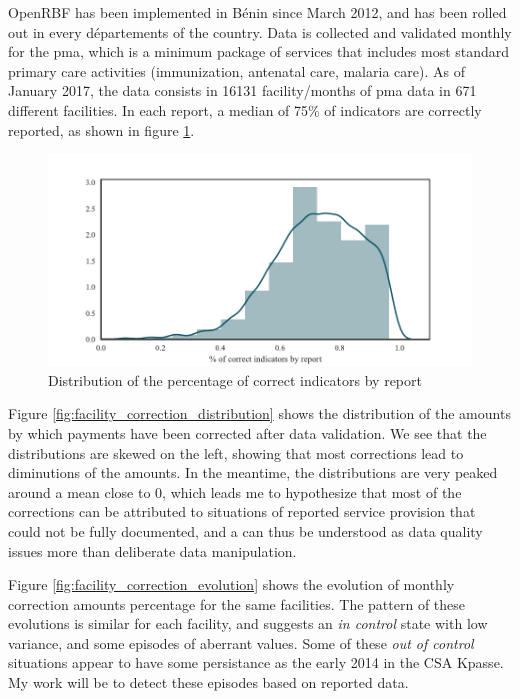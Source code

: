 OpenRBF has been implemented in Bénin since March 2012, and has been rolled out in every départements of the country. Data is collected and validated monthly for the \gls{pma}, which is a minimum package of services that includes most standard primary care activities (immunization, antenatal care, malaria care). As of January 2017, the data consists in 16131 facility/months of \gls{pma} data in 671 different facilities. In each report, a median of 75\% of indicators are correctly reported, as shown in figure \ref{fig:dist_percent_correct}.

\begin{center}
\begin{figure}[ht]
\includegraphics[width=\textwidth]{figure/correct_dist.pdf}
\caption{Distribution of the percentage of correct indicators by report}
\label{fig:dist_percent_correct}
\end{figure}
\end{center}

Figure \ref{fig:facility_correction_distribution} shows the distribution of the amounts by which payments have been corrected after data validation. We see that the distributions are skewed on the left, showing that most corrections lead to diminutions of the amounts. In the meantime, the distributions are very peaked around a mean close to 0, which leads me to hypothesize that most of the corrections can be attributed to situations of reported  service provision that could not be fully documented, and a can thus be understood as data quality issues more than deliberate data manipulation.

Figure \ref{fig:facility_correction_evolution} shows the evolution of monthly correction amounts percentage for the same facilities. The pattern of these evolutions is similar for each facility, and suggests an \textit{in control} state with low variance, and some episodes of aberrant values. Some of these \textit{out of control} situations appear to have some persistance as the early 2014 in the CSA Kpasse. My work will be to detect these episodes based on reported data.

